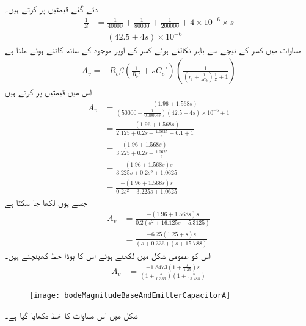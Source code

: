 دئے گئے قیمتیں پر کرتے ہیں۔
\begin{align*}
\frac{1}{Z}&=\frac{1}{40000}+\frac{1}{80000}+\frac{1}{200000}+4\times 10^{-6}\times s\\
&=\left(42.5+4s \right)\times 10^{-6}
\end{align*} 
مساوات  میں کسر کے نیچے   سے  باہر نکالتے ہوئے کسر کے اوپر موجود  کے ساتھ کاٹتے ہوئے ملتا ہے
\begin{align*}
A_v=-R_c \beta \left(\frac{1}{R_e'}+s C_e' \right) \left(\frac{1}{\left(r_i+\frac{1}{sC_b}\right)\frac{1}{Z}+1} \right)
\end{align*}
اس میں قیمتیں پر کرتے ہیں
\begin{align*}
A_v&= \frac{-\left(1.96+1.568 s \right)}{\left(50000+\frac{1}{0.00004 s}\right)\left(42.5+4s \right)\times 10^{-6}+1}\\
&=\frac{-\left(1.96+1.568 s \right)}{2.125+0.2 s+\frac{1.0625}{s}+0.1+1}\\
&=\frac{-\left(1.96+1.568 s \right)}{3.225+0.2 s+\frac{1.0625}{s}}\\
&=\frac{-\left(1.96+1.568 s \right) s}{3.225 s+0.2 s^2+1.0625}\\
&=\frac{-\left(1.96+1.568 s \right) s}{0.2 s^2+3.225 s+1.0625}
\end{align*}
جسے یوں لکھا جا سکتا ہے
\begin{align*}
A_v&=\frac{-\left(1.96+1.568 s \right) s}{0.2 \left(s^2+16.125 s+5.3125\right)}\\
&=\frac{-6.25 \left(1.25+s \right) s}{\left(s+0.336 \right)\left(s+15.788 \right)}
\end{align*}
اس کو عمومی شکل میں لکھتے ہوئے اس کا بوڈا خط کھینچتے ہیں۔
\begin{align}\label{مساوات_تعددی_ردعمل_قابو_مخارج_عمومی_شکل_کی_مساوات}
A_v&=\frac{-1.8473\left(1+\frac{s}{1.25} \right) s}{\left(1+\frac{s}{0.336} \right)\left(1+\frac{s}{15.788}\right)}
\end{align}
%
\begin{figure}
\centering
\texttt{[image: bodeMagnitudeBaseAndEmitterCapacitorA]}
\caption{}
\label{شکل_تعددی_ردعمل_سوال_قابو_مخارج_کپیسٹر_کونا}
\end{figure}
%
شکل  میں اس مساوات کا خط دکھایا گیا ہے۔

